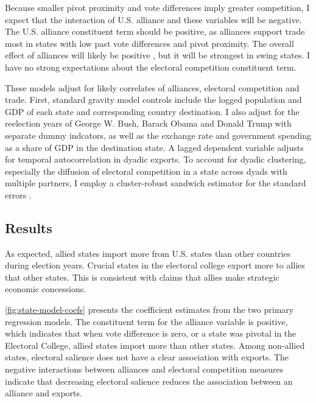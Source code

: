 \documentclass[12pt]{article}
\begin{document}
Because smaller pivot proximity and vote differences imply greater competition, I expect that the interaction of U.S. alliance and these variables will be negative. 
The U.S. alliance constituent term should be positive, as alliances support trade most in states with low past vote differences and pivot proximity.
The overall effect of alliances will likely be positive \citep{GowaMansfield2004, Fordham2010}, but it will be strongest in swing states. 
I have no strong expectations about the electoral competition constituent term.


These models adjust for likely correlates of alliances, electoral competition and trade.
First, standard gravity model controls include the logged population and GDP of each state and corresponding country destination. 
I also adjust for the reelection years of George W. Bush, Barack Obama and Donald Trump with separate dummy indcators, as well as the exchange rate and government spending as a share of GDP in the destination state. 
A lagged dependent variable adjusts for temporal autocorrelation in dyadic exports.
To account for dyadic clustering, especially the diffusion of electoral competition in a state across dyads with multiple partners, I employ a cluster-robust sandwich estimator for the standard errors \citep{Aronowetal2015}.



\subsection{Results}

As expected, allied states import more from U.S. states than other countries during election years. 
Crucial states in the electoral college export more to allies that other states. 
This is consistent with claims that allies make strategic economic concessions. 


\autoref{fig:state-model-coefs} presents the coefficient estimates from the two primary regression models. 
The constituent term for the alliance variable is positive, which indicates that when vote difference is zero, or a state was pivotal in the Electoral College, allied states import more than other states. 
Among non-allied states, electoral salience does not have a clear association with exports. 
The negative interactions between alliances and electoral competition measures indicate that decreasing electoral salience reduces the association between an alliance and exports. 
\end{document}
